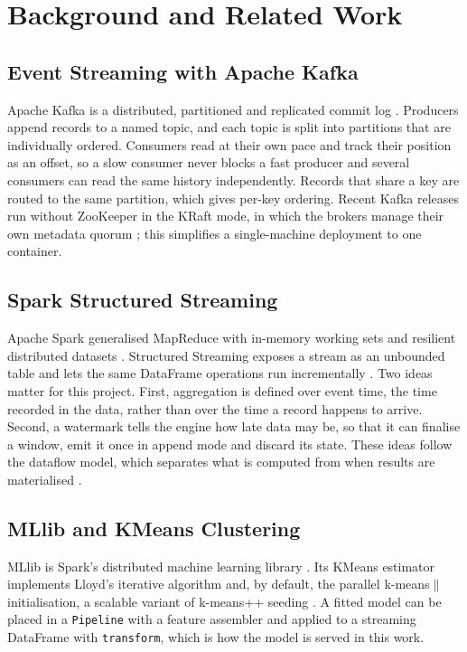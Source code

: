 \documentclass[conference]{IEEEtran}
\newcommand{\code}[1]{\texttt{#1}}
\begin{document}
\section{Background and Related Work}

\subsection{Event Streaming with Apache Kafka}
Apache Kafka is a distributed, partitioned and replicated commit log \cite{kreps2011}. Producers append records to a named topic, and each topic is split into partitions that are individually ordered. Consumers read at their own pace and track their position as an offset, so a slow consumer never blocks a fast producer and several consumers can read the same history independently. Records that share a key are routed to the same partition, which gives per-key ordering. Recent Kafka releases run without ZooKeeper in the KRaft mode, in which the brokers manage their own metadata quorum \cite{kip500}; this simplifies a single-machine deployment to one container.

\subsection{Spark Structured Streaming}
Apache Spark generalised MapReduce with in-memory working sets and resilient distributed datasets \cite{zaharia2010,zaharia2012}. Structured Streaming exposes a stream as an unbounded table and lets the same DataFrame operations run incrementally \cite{armbrust2018}. Two ideas matter for this project. First, aggregation is defined over event time, the time recorded in the data, rather than over the time a record happens to arrive. Second, a watermark tells the engine how late data may be, so that it can finalise a window, emit it once in append mode and discard its state. These ideas follow the dataflow model, which separates what is computed from when results are materialised \cite{akidau2015}.

\subsection{MLlib and KMeans Clustering}
MLlib is Spark's distributed machine learning library \cite{meng2016}. Its KMeans estimator implements Lloyd's iterative algorithm \cite{lloyd1982} and, by default, the parallel k-means$\|$ initialisation, a scalable variant of k-means++ seeding \cite{arthur2007,bahmani2012}. A fitted model can be placed in a \code{Pipeline} with a feature assembler and applied to a streaming DataFrame with \code{transform}, which is how the model is served in this work.
\end{document}
